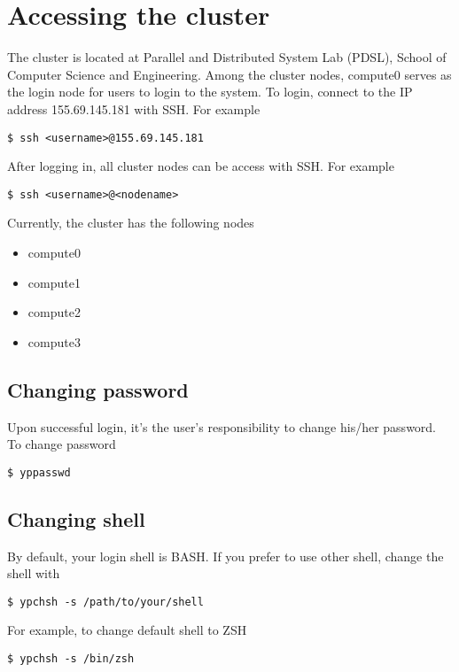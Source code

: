 \section{Accessing the cluster}

The cluster is located at Parallel and Distributed System Lab (PDSL), School of Computer Science and Engineering. Among the cluster nodes, compute0 serves as the login node for users to login to the system. To login, connect to the IP address 155.69.145.181 with SSH. For example

\begin{lstlisting}
$ ssh <username>@155.69.145.181
\end{lstlisting}

\noindent After logging in, all cluster nodes can be access with SSH. For example

\begin{lstlisting}
$ ssh <username>@<nodename>
\end{lstlisting}

\noindent Currently, the cluster has the following nodes

\begin{itemize}
    \item compute0
    \item compute1
    \item compute2
    \item compute3
\end{itemize}

\subsection{Changing password}

Upon successful login, it's the user's responsibility to change his/her password. To change password

\begin{lstlisting}
$ yppasswd
\end{lstlisting}

\subsection{Changing shell}

By default, your login shell is BASH. If you prefer to use other shell, change the shell with

\begin{lstlisting}
$ ypchsh -s /path/to/your/shell
\end{lstlisting}

\noindent For example, to change default shell to ZSH

\begin{lstlisting}
$ ypchsh -s /bin/zsh
\end{lstlisting}